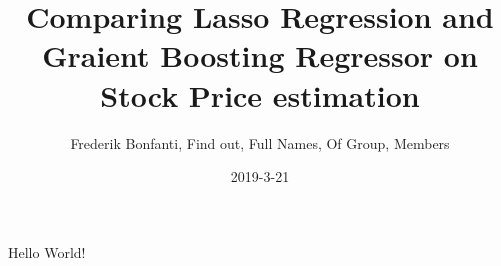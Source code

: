 \documentclass{article}
\title{Comparing Lasso Regression and Graient Boosting Regressor on Stock Price estimation}
\date{2019-3-21}
\author{Frederik Bonfanti, Find out, Full Names, Of Group, Members}
\begin{document}
  \maketitle
  
  Hello World!
\end{document}
